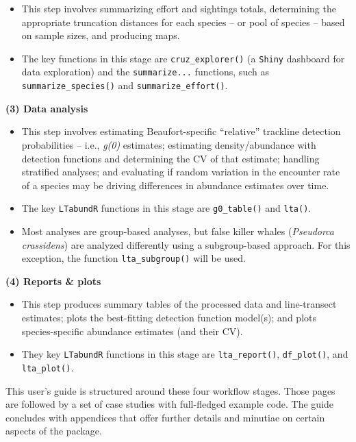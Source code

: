 \documentclass[
]{book}
\begin{document}
\begin{itemize}
\item
  This step involves summarizing effort and sightings totals, determining the appropriate truncation distances for each species -- or pool of species -- based on sample sizes, and producing maps.
\item
  The key functions in this stage are \texttt{cruz\_explorer()} (a \texttt{Shiny} dashboard for data exploration) and the \texttt{summarize...} functions, such as \texttt{summarize\_species()} and \texttt{summarize\_effort()}.
\end{itemize}

\textbf{(3) Data analysis}

\begin{itemize}
\item
  This step involves estimating Beaufort-specific ``relative'' trackline detection probabilities -- i.e., \emph{g(0)} estimates; estimating density/abundance with detection functions and determining the CV of that estimate; handling stratified analyses; and evaluating if random variation in the encounter rate of a species may be driving differences in abundance estimates over time.
\item
  The key \texttt{LTabundR} functions in this stage are \texttt{g0\_table()} and \texttt{lta()}.
\item
  Most analyses are group-based analyses, but false killer whales (\emph{Pseudorca crassidens}) are analyzed differently using a subgroup-based approach. For this exception, the function \texttt{lta\_subgroup()} will be used.
\end{itemize}

\textbf{(4) Reports \& plots}

\begin{itemize}
\item
  This step produces summary tables of the processed data and line-transect estimates; plots the best-fitting detection function model(s); and plots species-specific abundance estimates (and their CV).
\item
  They key \texttt{LTabundR} functions in this stage are \texttt{lta\_report()}, \texttt{df\_plot()}, and \texttt{lta\_plot()}.
\end{itemize}

This user's guide is structured around these four workflow stages. Those pages are followed by a set of case studies with full-fledged example code. The guide concludes with appendices that offer further details and minutiae on certain aspects of the package.
\end{document}
